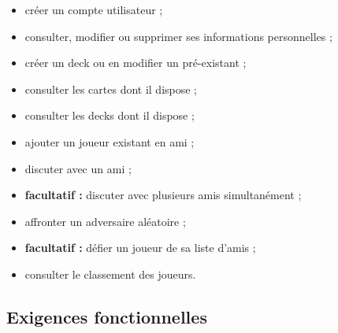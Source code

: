 \documentclass[12pt]{article}
\begin{document}
	\begin{itemize}
		\item créer un compte utilisateur ;
		\item consulter, modifier ou supprimer ses informations personnelles ; 
		\item créer un \gls{deck} ou en modifier un pré-existant ;
		\item consulter les cartes dont il dispose ;
		\item consulter les \glspl{deck} dont il dispose ;
		\item ajouter un joueur existant en ami ;
		\item discuter avec un ami ;
		\item \textbf{\gls{facultatif} :} discuter avec plusieurs amis simultanément ;
		\item affronter un adversaire aléatoire ;
		\item \textbf{\gls{facultatif} :} défier un joueur de sa liste d'amis ;
		\item consulter le classement des joueurs.
	\end{itemize}

	\subsection{Exigences fonctionnelles}
\end{document}
